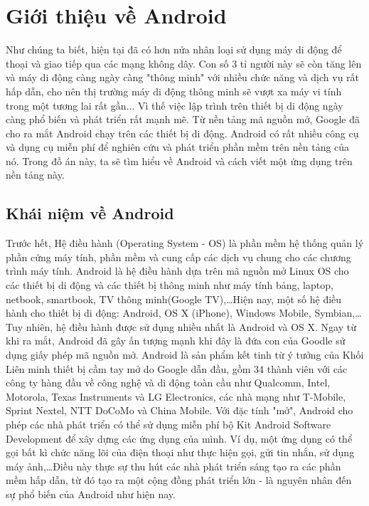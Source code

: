 \section{Giới thiệu về Android}
Như chúng ta biết, hiện tại đã có hơn nửa nhân loại sử dụng máy di động để thoại và giao tiếp qua các mạng không dây. Con số 3 tỉ người này sẽ còn tăng lên và máy di động càng ngày càng "thông minh" với nhiều chức năng và dịch vụ rất hấp dẫn, cho nên thị trường máy di động thông minh sẽ vượt xa máy vi tính trong một tương lai rất gần... Vì thế việc lập trình trên thiết bị di động ngày càng phổ biến và phát triển rất mạnh mẽ. Từ nền tảng mã nguồn mở, Google đã cho ra mắt Android chạy trên các thiết bị di động. Android có rất nhiều công cụ và dụng cụ miễn phí để nghiên cứu và phát triển phần mềm trên nền tảng của nó. Trong đồ án này, ta sẽ tìm hiểu về Android và cách viết một ứng dụng trên nền tảng này.

\subsection{Khái niệm về Android}
Trước hết, Hệ điều hành (Operating System - OS) là phần mềm hệ thống quản lý phần cứng máy tính, phần mềm và cung cấp các dịch vụ chung cho các chương trình máy tính.
Android là hệ điều hành dựa trên mã nguồn mở Linux OS cho các thiết bị di động và các thiết bị thông minh như máy tính bảng, laptop, netbook, smartbook, TV thông minh(Google TV),\dots Hiện nay, một số hệ điều hành cho thiết bị di động: Android, OS X (iPhone), Windows Mobile, Symbian,\dots Tuy nhiên, hệ điều hành được sử dụng nhiều nhất là Android và OS X.
\newline
Ngay từ khi ra mắt, Android đã gây ấn tượng mạnh khi đây là đứa con của Goodle sử dụng giấy phép mã nguồn mở. Android là sản phẩm kết tinh từ ý tưởng của Khối Liên minh thiết bị cầm tay mở do Google dẫn đầu, gồm 34 thành viên với các công ty hàng đầu về công nghệ và di động toàn cầu như Qualcomm, Intel, Motorola, Texas Instruments và LG Electronics, các nhà mạng như T-Mobile, Sprint Nextel, NTT DoCoMo và China Mobile.
\newline
Với đặc tính "mở", Android cho phép các nhà phát triển có thể sử dụng miễn phí bộ Kit Android Software Development để xây dựng các ứng dụng của mình. Ví dụ, một ứng dụng có thể gọi bất kì chức năng lõi của điện thoại như thực hiện gọi, gửi tin nhắn, sử dụng máy ảnh,\dots Điều này thực sự thu hút các nhà phát triển sáng tạo ra các phần mềm hấp dẫn, từ đó tạo ra một cộng đồng phát triển lớn - là nguyên nhân đến sự phổ biến của Android như hiện nay.

